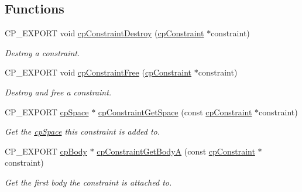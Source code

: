 \subsection*{Functions}
\begin{DoxyCompactItemize}
\item 
\mbox{\label{group__cpConstraint_ga126b8fae3e1ac798ed986112cbdec701}} 
C\+P\+\_\+\+E\+X\+P\+O\+RT void \hyperlink{group__cpConstraint_ga126b8fae3e1ac798ed986112cbdec701}{cp\+Constraint\+Destroy} (\hyperlink{structcpConstraint}{cp\+Constraint} $\ast$constraint)
\begin{DoxyCompactList}\small\item\em Destroy a constraint. \end{DoxyCompactList}\item 
\mbox{\label{group__cpConstraint_ga00928cb83dfaeb0b7eed7d6e635fdffd}} 
C\+P\+\_\+\+E\+X\+P\+O\+RT void \hyperlink{group__cpConstraint_ga00928cb83dfaeb0b7eed7d6e635fdffd}{cp\+Constraint\+Free} (\hyperlink{structcpConstraint}{cp\+Constraint} $\ast$constraint)
\begin{DoxyCompactList}\small\item\em Destroy and free a constraint. \end{DoxyCompactList}\item 
\mbox{\label{group__cpConstraint_ga0a1511adcaafe408b386a34bda90f0a1}} 
C\+P\+\_\+\+E\+X\+P\+O\+RT \hyperlink{structcpSpace}{cp\+Space} $\ast$ \hyperlink{group__cpConstraint_ga0a1511adcaafe408b386a34bda90f0a1}{cp\+Constraint\+Get\+Space} (const \hyperlink{structcpConstraint}{cp\+Constraint} $\ast$constraint)
\begin{DoxyCompactList}\small\item\em Get the \hyperlink{structcpSpace}{cp\+Space} this constraint is added to. \end{DoxyCompactList}\item 
\mbox{\label{group__cpConstraint_ga58035f02ef8906ec95ad7867f4c2d9c5}} 
C\+P\+\_\+\+E\+X\+P\+O\+RT \hyperlink{structcpBody}{cp\+Body} $\ast$ \hyperlink{group__cpConstraint_ga58035f02ef8906ec95ad7867f4c2d9c5}{cp\+Constraint\+Get\+BodyA} (const \hyperlink{structcpConstraint}{cp\+Constraint} $\ast$constraint)
\begin{DoxyCompactList}\small\item\em Get the first body the constraint is attached to. \end{DoxyCompactList}\item 

\end{DoxyCompactItemize}
